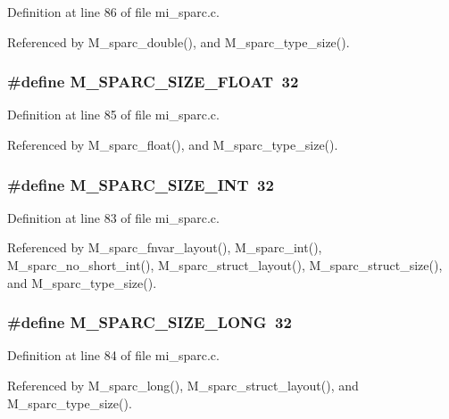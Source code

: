 Definition at line 86 of file mi\_\-sparc.c.

Referenced by M\_\-sparc\_\-double(), and M\_\-sparc\_\-type\_\-size().
\subsubsection{\setlength{\rightskip}{0pt plus 5cm}\#define M\_\-SPARC\_\-SIZE\_\-FLOAT~32}\label{mi__sparc_8c_5d48e91334b36f93a981ae6b6596b680}




Definition at line 85 of file mi\_\-sparc.c.

Referenced by M\_\-sparc\_\-float(), and M\_\-sparc\_\-type\_\-size().
\subsubsection{\setlength{\rightskip}{0pt plus 5cm}\#define M\_\-SPARC\_\-SIZE\_\-INT~32}\label{mi__sparc_8c_204a833fe7583735c82861a4b08cc894}




Definition at line 83 of file mi\_\-sparc.c.

Referenced by M\_\-sparc\_\-fnvar\_\-layout(), M\_\-sparc\_\-int(), M\_\-sparc\_\-no\_\-short\_\-int(), M\_\-sparc\_\-struct\_\-layout(), M\_\-sparc\_\-struct\_\-size(), and M\_\-sparc\_\-type\_\-size().
\subsubsection{\setlength{\rightskip}{0pt plus 5cm}\#define M\_\-SPARC\_\-SIZE\_\-LONG~32}\label{mi__sparc_8c_768a9923f485a31fa70c6d3cb1a48e42}




Definition at line 84 of file mi\_\-sparc.c.

Referenced by M\_\-sparc\_\-long(), M\_\-sparc\_\-struct\_\-layout(), and M\_\-sparc\_\-type\_\-size().

